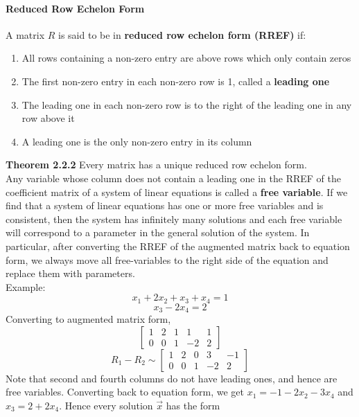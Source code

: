 \documentclass[10pt,letter]{article}
\begin{document}
\paragraph{Reduced Row Echelon Form} A matrix $R$ is said to be in \textbf{reduced row echelon form (RREF)} if: \begin{enumerate}
    \item All rows containing a non-zero entry are above rows which only contain zeros 
    \item The first non-zero entry in each non-zero row is 1, called a \textbf{leading one}
    \item The leading one in each non-zero row is to the right of the leading one in any row above it 
    \item A leading one is the only non-zero entry in its column
\end{enumerate}
\textbf{Theorem 2.2.2} Every matrix has a unique reduced row echelon form. \\ 
Any variable whose column does not contain a leading one in the RREF of the coefficient matrix of a system of linear equations is called a \textbf{free variable}. If we find that a system of linear equations has one or more free variables and is consistent, then the system has infinitely many solutions and each free variable will correspond to a parameter in the general solution of the system. In particular, after converting the RREF of the augmented matrix back to equation form, we always move all free-variables to the right side of the equation and replace them with parameters. \\ 
Example: $$x_1+2x_2+x_3+x_4=1$$ $$x_3-2x_4=2$$ Converting to augmented matrix form, $$\left[\begin{array}{rrrr|r}
    1 & 2 & 1 & 1 & 1 \\
    0 & 0 & 1 & -2 & 2
\end{array}\right]$$ 
$$R_1-R_2\sim \left[\begin{array}{rrrr|r}
    1 & 2 & 0 & 3 & -1 \\
    0 & 0 & 1 & -2 & 2
\end{array}\right]$$ Note that second and fourth columns do not have leading ones, and hence are free variables. Converting back to equation form, we get $x_1 = -1-2x_2-3x_4$ and $x_3 = 2+2x_4$. Hence every solution $\vec{x}$ has the form 
\end{document}
